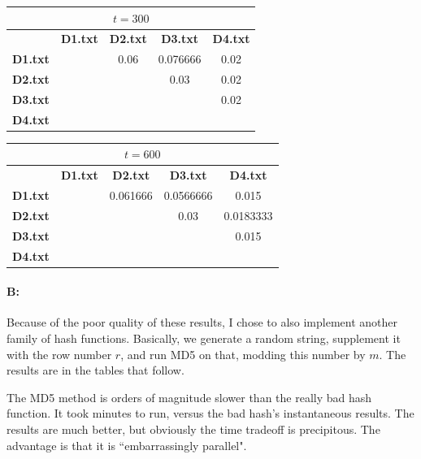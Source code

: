 \documentclass[11pt]{article}
\begin{document}
\begin{center}

\begin{tabular}{| c || c | c | c | c |}
\hline
\multicolumn{5}{|c|}{$t = 300$} \\
\hline
& \textbf{D1.txt} & \textbf{D2.txt}  & \textbf{D3.txt}  & \textbf{D4.txt} \\
\hline
\hline
\textbf{D1.txt} &  & 0.06 & 0.076666 & 0.02 \\
\hline
\textbf{D2.txt} &  & & 0.03 & 0.02 \\
\hline
\textbf{D3.txt} &  &  &  & 0.02 \\
\hline
\textbf{D4.txt} &  &  &  &  \\
\hline
\end{tabular}

\end{center}

\begin{center}

\begin{tabular}{| c || c | c | c | c |}
\hline
\multicolumn{5}{|c|}{$t = 600$} \\
\hline
& \textbf{D1.txt} & \textbf{D2.txt}  & \textbf{D3.txt}  & \textbf{D4.txt} \\
\hline
\hline
\textbf{D1.txt} &  & 0.061666 & 0.0566666 & 0.015 \\
\hline
\textbf{D2.txt} &  & & 0.03 & 0.0183333 \\
\hline
\textbf{D3.txt} &  &  &  & 0.015 \\
\hline
\textbf{D4.txt} &  &  &  &  \\
\hline
\end{tabular}

\end{center}



\paragraph{B:} Because of the poor quality of these results, I chose to also implement another family of hash functions. Basically, we generate a random string, supplement it with the row number $r$, and run MD5 on that, modding this number by $m$. The results are in the tables that follow.

The MD5 method is orders of magnitude slower than the really bad hash function. It took minutes to run, versus the bad hash's instantaneous results. The results are much better, but obviously the time tradeoff is precipitous. The advantage is that it is ``embarrassingly parallel".
\end{document}
